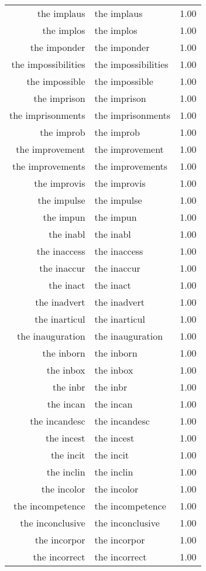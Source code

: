 \begin{table}[ht]
\begin{tabular}{rlr}
  the implaus & the implaus & 1.00 \\ 
  the implos & the implos & 1.00 \\ 
  the imponder & the imponder & 1.00 \\ 
  the impossibilities & the impossibilities & 1.00 \\ 
  the impossible & the impossible & 1.00 \\ 
  the imprison & the imprison & 1.00 \\ 
  the imprisonments & the imprisonments & 1.00 \\ 
  the improb & the improb & 1.00 \\ 
  the improvement & the improvement & 1.00 \\ 
  the improvements & the improvements & 1.00 \\ 
  the improvis & the improvis & 1.00 \\ 
  the impulse & the impulse & 1.00 \\ 
  the impun & the impun & 1.00 \\ 
  the inabl & the inabl & 1.00 \\ 
  the inaccess & the inaccess & 1.00 \\ 
  the inaccur & the inaccur & 1.00 \\ 
  the inact & the inact & 1.00 \\ 
  the inadvert & the inadvert & 1.00 \\ 
  the inarticul & the inarticul & 1.00 \\ 
  the inauguration & the inauguration & 1.00 \\ 
  the inborn & the inborn & 1.00 \\ 
  the inbox & the inbox & 1.00 \\ 
  the inbr & the inbr & 1.00 \\ 
  the incan & the incan & 1.00 \\ 
  the incandesc & the incandesc & 1.00 \\ 
  the incest & the incest & 1.00 \\ 
  the incit & the incit & 1.00 \\ 
  the inclin & the inclin & 1.00 \\ 
  the incolor & the incolor & 1.00 \\ 
  the incompetence & the incompetence & 1.00 \\ 
  the inconclusive & the inconclusive & 1.00 \\ 
  the incorpor & the incorpor & 1.00 \\ 
  the incorrect & the incorrect & 1.00 \\ 

\end{tabular}
\end{table}
